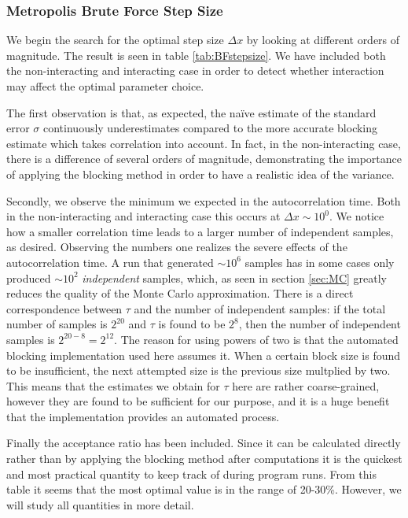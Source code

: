 \documentclass[twoside,english]{uiofysmaster}
\begin{document}
\subsubsection{Metropolis Brute Force Step Size}

We begin the search for the optimal step size $\Delta x$ by looking at different orders of magnitude. The result is seen in table \ref{tab:BFstepsize}. We have included both the non-interacting and interacting case in order to detect whether interaction may affect the optimal parameter choice.

The first observation is that, as expected, the na\"ive estimate of the standard error $\sigma$ continuously underestimates compared to the more accurate blocking estimate which takes correlation into account. In fact, in the non-interacting case, there is a difference of several orders of magnitude, demonstrating the importance of applying the blocking method in order to have a realistic idea of the variance.

Secondly, we observe the minimum we expected in the autocorrelation time. Both in the non-interacting and interacting case this occurs at $\Delta x \sim 10^0$. We notice how a smaller correlation time leads to a larger number of independent samples, as desired. Observing the numbers one realizes the severe effects of the autocorrelation time. A run that generated $\sim 10^6$ samples has in some cases only produced $\sim 10^2$ \textit{independent} samples, which, as seen in section \ref{sec:MC} greatly reduces the quality of the Monte Carlo approximation.
There is a direct correspondence between $\tau$ and the number of independent samples: if the total number of samples is $2^{20}$ and $\tau$ is found to be $2^8$, then the number of independent samples is $2^{20-8} = 2^{12}$. The reason for using powers of two is that the automated blocking implementation used here assumes it. When a certain block size is found to be insufficient, the next attempted size is the previous size multplied by two. This means that the estimates we obtain for $\tau$ here are rather coarse-grained, however they are found to be sufficient for our purpose, and it is a huge benefit that the implementation provides an automated process.

Finally the acceptance ratio has been included. Since it can be calculated directly rather than by applying the blocking method after computations it is the quickest and most practical quantity to keep track of during program runs. From this table it seems that the most optimal value is in the range of 20-30\%. However, we will study all quantities in more detail.
\end{document}

